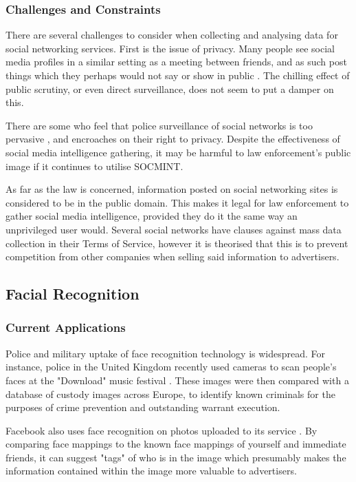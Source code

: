 \documentclass[12pt]{article}
\begin{document}
\subsubsection{Challenges and Constraints}
There are several challenges to consider when collecting and analysing data for social networking services. First is the issue of privacy. Many people see social media profiles in a similar setting as a meeting between friends, and as such post things which they perhaps would not say or show in public \citep{socialmediacontent}. The chilling effect of public scrutiny, or even direct surveillance, does not seem to put a damper on this.

There are some who feel that police surveillance of social networks is too pervasive \citep{socmintlawenforcement}, and encroaches on their right to privacy. Despite the effectiveness of social media intelligence gathering, it may be harmful to law enforcement's public image if it continues to utilise SOCMINT.

As far as the law is concerned, information posted on social networking sites is considered to be in the public domain. This makes it legal for law enforcement to gather social media intelligence, provided they do it the same way an unprivileged user would. Several social networks have clauses against mass data collection in their Terms of Service, however it is theorised that this is to prevent competition from other companies when selling said information to advertisers.

\subsection{Facial Recognition}
\subsubsection{Current Applications}
Police and military uptake of face recognition technology is widespread. For instance, police in the United Kingdom recently used cameras to scan people's faces at the "Download" music festival \citep{policefacerecog}. These images were then compared with a database of custody images across Europe, to identify known criminals for the purposes of crime prevention and outstanding warrant execution.

Facebook also uses face recognition on photos uploaded to its service \citep{facebookfacerecog}. By comparing face mappings to the known face mappings of yourself and immediate friends, it can suggest "tags" of who is in the image which presumably makes the information contained within the image more valuable to advertisers.
\end{document}
